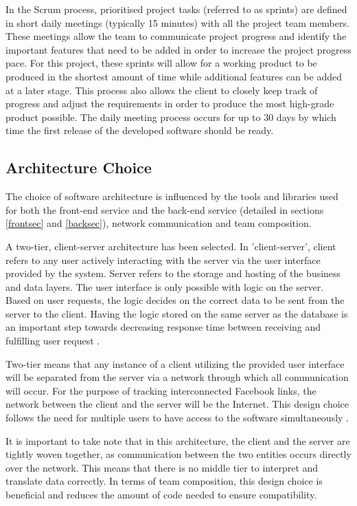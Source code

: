 \documentclass[12pt,onecolumn]{article}
\begin{document}
	In the Scrum process, prioritised project tasks (referred to as sprints) are defined in short daily meetings (typically 15 minutes) with all the project team members. These meetings allow the team to communicate project progress and identify the important features that need to be added in order to increase the project progress pace. For this project, these sprints will allow for a working product to be produced in the shortest amount of time while additional features can be  added at a later stage. This process also allows the client to closely keep track of progress and adjust the requirements in order to produce the most high-grade product possible. The daily meeting process occurs for up to 30 days by which time the first release of the developed software should be ready.   
	
	
	\subsection{Architecture Choice}
	The choice of software architecture is influenced by the tools and libraries used for both the front-end service and the back-end service (detailed in sections \ref{frontsec} and \ref{backsec}), network communication and team composition. 
	
	A two-tier, client-server architecture has been selected. In 'client-server', client refers to any user actively interacting with the server via the user interface provided by the system. Server refers to the storage and hosting of the business and data layers. The user interface is only possible with logic on the server. Based on user requests, the logic decides on the correct data to be sent from the server to the client. Having the logic stored on the same server as the database is an important step towards decreasing response time between receiving and fulfilling user request \cite{twotieradvantage}. 
	
	Two-tier means that any instance of a client utilizing the provided user interface will be separated from the server via a network through which all communication will occur. For the purpose of tracking interconnected Facebook links, the network between the client and the server will be the Internet. This design choice follows the need for multiple users to have access to the software simultaneously \cite{beginningsofteng}. 
	
	It is important to take note that in this architecture, the client and the server are tightly woven together, as communication between the two entities occurs directly over the network. This means that there is no middle tier to interpret and translate data correctly. In terms of team composition, this design choice is beneficial and reduces the amount of code needed to ensure compatibility.
	
\end{document}
